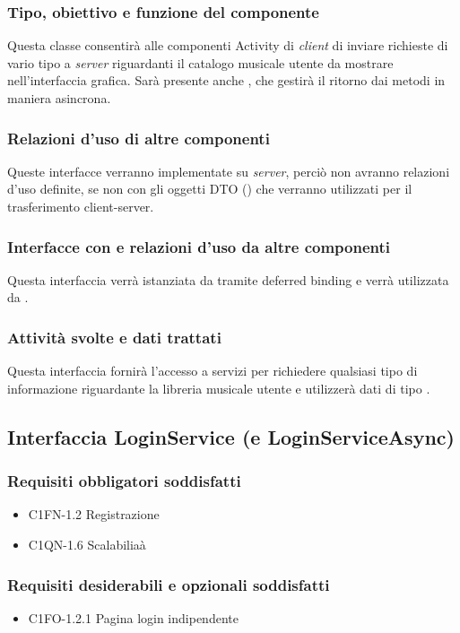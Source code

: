 \subsubsection*{Tipo, obiettivo e funzione del componente}
Questa classe consentir\`a alle componenti Activity di \emph{client} di inviare
richieste di vario tipo a \emph{server} riguardanti il catalogo musicale utente
da mostrare nell'interfaccia grafica. Sar\`a presente anche
, che gestir\`a il ritorno dai metodi in maniera
asincrona.
\subsubsection*{Relazioni d'uso di altre componenti}
Queste interfacce verranno implementate su \emph{server}, perci\`o non
avranno relazioni d'uso definite, se non con gli oggetti DTO
() che verranno utilizzati per il trasferimento
client-server.
\subsubsection*{Interfacce con e relazioni d'uso da altre componenti}
Questa interfaccia verr\`a istanziata da  tramite deferred
binding e verr\`a utilizzata da .
\subsubsection*{Attivit\`a svolte e dati trattati}
Questa interfaccia fornir\`a l'accesso a servizi per richiedere qualsiasi tipo
di informazione riguardante la libreria musicale utente e utilizzer\`a dati di
tipo .


\subsection{Interfaccia LoginService (e LoginServiceAsync)}
\subsubsection*{Requisiti obbligatori soddisfatti}
\begin{itemize}
	\item C1FN-1.2 Registrazione
	\item C1QN-1.6 Scalabilia\`a
\end{itemize}
\subsubsection*{Requisiti desiderabili e opzionali soddisfatti}
\begin{itemize}
    \item C1FO-1.2.1 Pagina login indipendente
\end{itemize}
